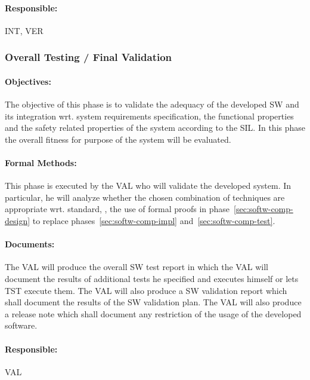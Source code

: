 \paragraph{Responsible:}
\label{sec:sw-int-responsible}
INT, VER

\subsubsection{Overall Testing / Final Validation}
\label{sec:overall-testing-}

\paragraph{Objectives:}
\label{sec:sw-test-objectives}
The objective of this phase is to validate the adequacy of the developed SW and
its integration wrt. system requirements specification, the functional
properties and the safety related properties of the system according to the
SIL. In this phase the overall fitness for purpose of the system will be
evaluated.

\paragraph{Formal Methods:}
\label{sec:sw-test-formal-methods}
This phase is executed by the VAL who will validate the developed system. In
particular, he will analyze whether the chosen combination of techniques are
appropriate wrt. standard, \eg, the use of formal proofs in
phase~\ref{sec:softw-comp-design} to replace phases~\ref{sec:softw-comp-impl}
and~\ref{sec:softw-comp-test}.

\paragraph{Documents:}
\label{sec:sw-test-documents}
The VAL will produce the overall SW test report in which the VAL will document
the results of additional tests he specified and executes himself or lets TST
execute them. The VAL will also produce a SW validation report which shall
document the results of the SW validation plan. The VAL will also produce a
release note which shall document any restriction of the usage of the developed
software.

\paragraph{Responsible:}
\label{sec:sw-test-responsible}
VAL


